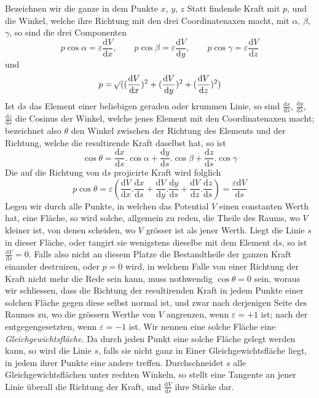 Bezeichnen wir die ganze in dem Punkte $x$, $y$, $z$ Statt findende Kraft mit $p$, und die Winkel, welche ihre Richtung mit den drei Coordinatenaxen macht, mit $\alpha$, $\beta$, $\gamma$, so sind die drei Componenten
\[
p\cos\alpha=\varepsilon\frac{\mathrm{d}V}{\mathrm{d}x},\qquad p\cos\beta=\varepsilon\frac{\mathrm{d}V}{\mathrm{d}y},\qquad p\cos\gamma=\varepsilon\frac{\mathrm{d}V}{\mathrm{d}z}
\]
und
\[
p=\mathord{{}^{}\!\surd}((\frac{\mathrm{d}V}{\mathrm{d}x})^2+(\frac{\mathrm{d}V}{\mathrm{d}y})^2+(\frac{\mathrm{d}V}{\mathrm{d}z})^2)
\]
Ist $\mathrm{d}s$ das Element einer beliebigen geraden oder krummen Linie, so sind $\frac{\mathrm{d}x}{\mathrm{d}s}$, $\frac{\mathrm{d}y}{\mathrm{d}s}$, $\frac{\mathrm{d}z}{\mathrm{d}s}$ die Cosinus der Winkel, welche jenes Element mit den Coordinatenaxen macht; bezeichnet also $\theta$ den Winkel zwischen der Richtung des Elements und der Richtung, welche die resultirende Kraft daselbst hat, so ist
\[
\cos\theta=\frac{\mathrm{d}x}{\mathrm{d}s}.\cos\alpha+\frac{\mathrm{d}y}{\mathrm{d}s}.\cos\beta+\frac{\mathrm{d}z}{\mathrm{d}s}.\cos\gamma
\]
Die auf die Richtung von $\mathrm{d}s$ projicirte Kraft wird folglich
\[
p\cos\theta=\varepsilon(\frac{\mathrm{d}V}{\mathrm{d}x}.\frac{\mathrm{d}x}{\mathrm{d}s}+\frac{\mathrm{d}V}{\mathrm{d}y}.\frac{\mathrm{d}y}{\mathrm{d}s}+\frac{\mathrm{d}V}{\mathrm{d}z}.\frac{\mathrm{d}z}{\mathrm{d}s})=\frac{\varepsilon\mathrm{d}V}{\mathrm{d}s}
\]
Legen wir durch alle Punkte, in welchen das Potential $V$ einen constanten Werth hat, eine Fläche, so wird solche, allgemein zu reden, die Theile des
Raums, wo $V$ kleiner ist, von denen scheiden, wo $V$ grösser ist als jener Werth. Liegt die Linie $s$ in dieser Fläche, oder tangirt sie wenigstens dieselbe mit dem Element $\mathrm{d}s$, so ist $\frac{\mathrm{d}V}{\mathrm{d}s}=0$. Falls also nicht an diesem Platze die Bestandtheile der ganzen Kraft einander destruiren, oder $p=0$ wird, in welchem Falle von einer Richtung der Kraft nicht mehr die Rede sein kann, muss nothwendig $\cos\theta=0$ sein, woraus wir schliessen, dass die Richtung der resultirenden Kraft in jedem Punkte einer solchen Fläche gegen diese selbst normal ist, und zwar nach derjenigen Seite des Raumes zu, wo die grössern Werthe von $V$ angrenzen, wenn $\varepsilon=+1$ ist; nach der entgegengesetzten, wenn $\varepsilon=-1$ ist. Wir nennen eine solche Fläche eine \textit{Gleichgewichtsfläche}. Da durch jeden Punkt eine solche Fläche gelegt werden kann, so wird die Linie $s$, falls sie nicht ganz in Einer Gleichgewichtsfläche liegt, in jedem ihrer Punkte eine andere treffen. Durchschneidet $s$ alle Gleichgewichtsflächen unter rechten Winkeln, so stellt eine Tangente an jener Linie überall die Richtung der Kraft, und $\frac{\mathrm{d}V}{\mathrm{d}s}$ ihre Stärke dar.

